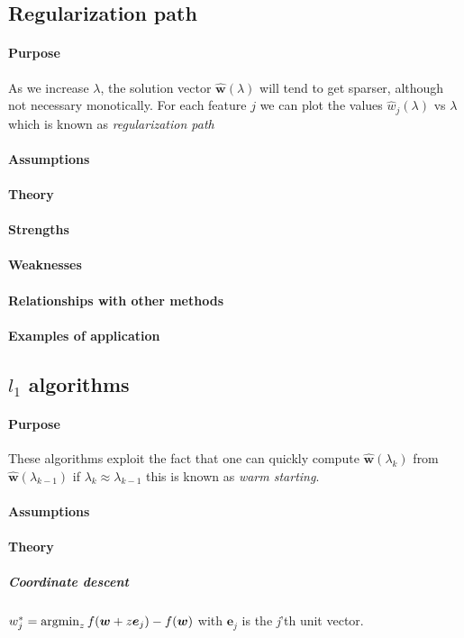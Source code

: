 \subsection{Regularization path}
\paragraph{Purpose}
As we increase $\lambda$, the solution vector $\hat{\bm{w}}(\lambda)$ will tend to get
sparser, although not necessary monotically. For each feature $j$ we can plot the 
values $\hat{w}_{j}(\lambda)$ vs $\lambda$ which is known as \emph{regularization path}
\paragraph{Assumptions}
\paragraph{Theory}
\paragraph{Strengths}
\paragraph{Weaknesses}
\paragraph{Relationships with other methods}
\paragraph{Examples of application}

\subsection{$l_{1}$ algorithms}
\paragraph{Purpose}
These algorithms exploit the fact that one can quickly compute $\hat{\bm{w}}(
\lambda_{k})$ from $\hat{\bm{w}}(\lambda_{k-1})$ if $\lambda_{k} \approx \lambda_{k-1}$
this is known as \emph{warm starting}.
\paragraph{Assumptions}
\paragraph{Theory}
\subparagraph{Coordinate descent}
$w^{*}_{j} = \operatorname*{argmin}_{z}f(\bm{w} + z\bm{e}_{j}) - f(\bm{w})$ with $\bm{e}_{j}$ is the 
\emph{j}'th unit vector. 

